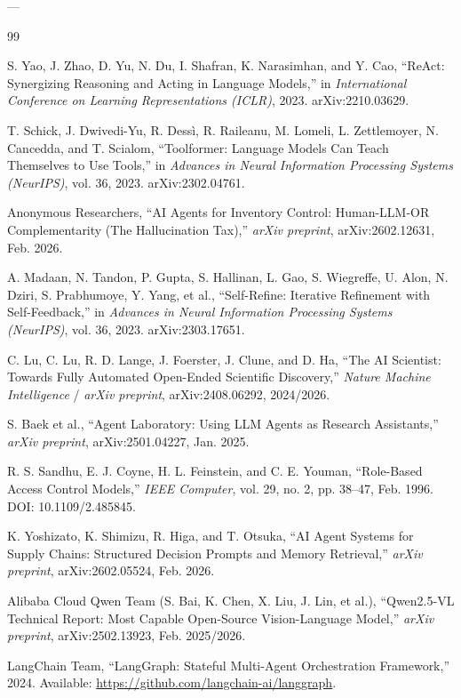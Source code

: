 \documentclass[11pt,a4paper]{article}
\begin{document}
---

\begin{thebibliography}{99}
\small
\setlength{\itemsep}{0.3pt}
\setlength{\parskip}{0pt}

 S. Yao, J. Zhao, D. Yu, N. Du, I. Shafran, K. Narasimhan, and Y. Cao, ``ReAct: Synergizing Reasoning and Acting in Language Models,'' in \textit{International Conference on Learning Representations (ICLR)}, 2023. arXiv:2210.03629.

 T. Schick, J. Dwivedi-Yu, R. Dessì, R. Raileanu, M. Lomeli, L. Zettlemoyer, N. Cancedda, and T. Scialom, ``Toolformer: Language Models Can Teach Themselves to Use Tools,'' in \textit{Advances in Neural Information Processing Systems (NeurIPS)}, vol. 36, 2023. arXiv:2302.04761.

 Anonymous Researchers, ``AI Agents for Inventory Control: Human-LLM-OR Complementarity (The Hallucination Tax),'' \textit{arXiv preprint}, arXiv:2602.12631, Feb. 2026.

 A. Madaan, N. Tandon, P. Gupta, S. Hallinan, L. Gao, S. Wiegreffe, U. Alon, N. Dziri, S. Prabhumoye, Y. Yang, et al., ``Self-Refine: Iterative Refinement with Self-Feedback,'' in \textit{Advances in Neural Information Processing Systems (NeurIPS)}, vol. 36, 2023. arXiv:2303.17651.

 C. Lu, C. Lu, R. D. Lange, J. Foerster, J. Clune, and D. Ha, ``The AI Scientist: Towards Fully Automated Open-Ended Scientific Discovery,'' \textit{Nature Machine Intelligence} / \textit{arXiv preprint}, arXiv:2408.06292, 2024/2026.

 S. Baek et al., ``Agent Laboratory: Using LLM Agents as Research Assistants,'' \textit{arXiv preprint}, arXiv:2501.04227, Jan. 2025.

 R. S. Sandhu, E. J. Coyne, H. L. Feinstein, and C. E. Youman, ``Role-Based Access Control Models,'' \textit{IEEE Computer}, vol. 29, no. 2, pp. 38--47, Feb. 1996. DOI: 10.1109/2.485845.

 K. Yoshizato, K. Shimizu, R. Higa, and T. Otsuka, ``AI Agent Systems for Supply Chains: Structured Decision Prompts and Memory Retrieval,'' \textit{arXiv preprint}, arXiv:2602.05524, Feb. 2026.

 Alibaba Cloud Qwen Team (S. Bai, K. Chen, X. Liu, J. Lin, et al.), ``Qwen2.5-VL Technical Report: Most Capable Open-Source Vision-Language Model,'' \textit{arXiv preprint}, arXiv:2502.13923, Feb. 2025/2026.

 LangChain Team, ``LangGraph: Stateful Multi-Agent Orchestration Framework,'' 2024. Available: \url{https://github.com/langchain-ai/langgraph}.

\end{thebibliography}
\end{document}
